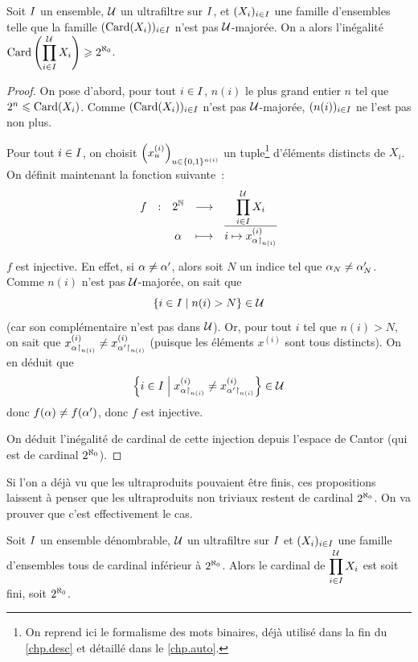 \begin{proposition}
  Soit $I$ un ensemble, $\mathcal{U}$ un ultrafiltre sur $I$, et
  $(X_i)_{i \in I}$ une famille d'ensembles telle que la famille
  $(\operatorname{Card}(X_i))_{i \in I}$ n'est pas $\mathcal{U}$-majorée. On a alors
  l'inégalité
  $\displaystyle\operatorname{Card}\left(\prod_{i \in I}^{\mathcal{U}}X_i\right) \geqslant 2^{\aleph_0}$.
\end{proposition}

\begin{proof}
  On pose d'abord, pour tout $i \in I$, $n(i)$ le plus grand entier $n$
  tel que $2^n \leqslant \operatorname{Card}(X_i)$. Comme $(\operatorname{Card}(X_i))_{i \in I}$ n'est pas
  $\mathcal{U}$-majorée, $(n(i))_{i \in I}$ ne l'est pas non plus.

  Pour tout $i \in I$, on choisit
  $\left(x_{u}^{(i)}\right)_{u\in \{0,1\}^{n(i)}}$ un
  tuple\footnote{On reprend ici le formalisme des mots binaires, déjà utilisé
  dans la fin du \cref{chp.desc} et détaillé dans le \cref{chp.auto}.}
  d'éléments distincts de $X_i$. On définit maintenant la fonction suivante~:
  \[\makeFun{f}{2^\bN}{\prod_{i \in \indSet}^{\varUlF}X_i}
            {\varCan}{\clas{i \mapsto x_{\varCan\restr{n(i)}}^{(i)}}}\]

  $f$ est injective. En effet, si $\alpha\neq\alpha'$, alors soit $N$
  un indice tel que $\alpha_N \neq \alpha_N'$. Comme $n(i)$ n'est pas
  $\mathcal{U}$-majorée, on sait que
  \[\left\{ i \in I \;\middle\vert\; n(i) > N \right\} \in \mathcal{U}\]
  (car son complémentaire n'est pas dans $\mathcal{U}$). Or, pour tout $i$ tel que
  $n(i) > N$, on sait que
  $x_{\alpha\mathbin{\upharpoonright}_{n(i)}}^{(i)}\neq x_{\alpha'\mathbin{\upharpoonright}_{n(i)}}^{(i)}$
  (puisque les éléments $x^{(i)}$ sont tous distincts). On en déduit que
  \[
  \left\{ i \in I \;\middle\vert\; x^{(i)}_{\alpha\mathbin{\upharpoonright}_{n(i)}}\neq x^{(i)}_{\alpha'\mathbin{\upharpoonright}_{n(i)}} \right\}
  \in\mathcal{U}\]
  donc $f(\alpha)\neq f(\alpha')$, donc $f$ est injective.

  On déduit l'inégalité de cardinal de cette injection depuis l'espace de
  Cantor (qui est de cardinal $2^{\aleph_0}$).
\end{proof}

Si l'on a déjà vu que les ultraproduits pouvaient être finis, ces propositions
laissent à penser que les ultraproduits non triviaux restent de cardinal
$2^{\aleph_0}$. On va prouver que c'est effectivement le cas.

\begin{proposition}
  Soit $I$ un ensemble dénombrable, $\mathcal{U}$ un ultrafiltre sur
  $I$ et $(X_i)_{i \in I}$ une famille d'ensembles tous de cardinal
  inférieur à $2^{\aleph_0}$. Alors le cardinal de
  $\displaystyle\prod_{i \in I}^{\mathcal{U}} X_i$ est soit fini, soit $2^{\aleph_0}$.
\end{proposition}

